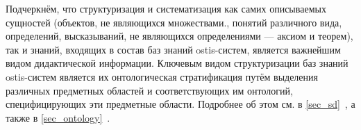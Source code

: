 \begin{SCn}
\end{SCn}

\begin{SCn}
\end{SCn}

\begin{SCn}
\end{SCn}

\begin{SCn}
\end{SCn}

\begin{SCn}
\end{SCn}

\begin{SCn}
\end{SCn}

\begin{SCn}
\end{SCn}

\begin{SCn}
\end{SCn}

Подчеркнём, что структуризация и систематизация как самих описываемых сущностей (объектов, не являющихся множествами., понятий различного вида, определений, высказываний, не являющихся определениями --- аксиом и теорем), так и знаний, входящих в состав баз знаний ostis-систем, является важнейшим видом дидактической информации. Ключевым видом структуризации баз знаний ostis-систем является их онтологическая стратификация путём выделения различных предметных областей и соответствующих им онтологий, специфицирующих эти предметные области. Подробнее об этом см. в \ref{sec_sd}~, а также в \ref{sec_ontology}~.

